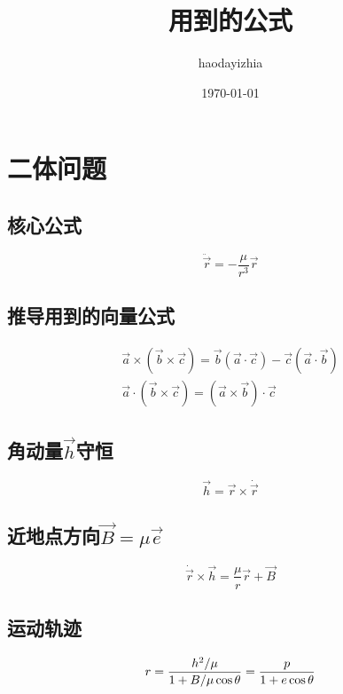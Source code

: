 \documentclass[UTF8]{ctexart}
\title{用到的公式}
\author{haodayizhia}
\date{\today}
\begin{document}
\renewcommand\theequation{%
\thesection.\arabic{equation}}

\maketitle
\tableofcontents
\section{二体问题}

\subsection{核心公式}
\begin{equation}
	\ddot{\vec{r}}=-\frac{\mu}{r^3}\vec{r}
\end{equation}

\subsection{推导用到的向量公式}

\begin{gather}
\vec{a}\times(\vec{b}\times\vec c) =\vec{b}(\vec{a}\cdot\vec{c})-\vec{c}(\vec{a}\cdot\vec{b})\\
\vec{a}\cdot(\vec{b}\times\vec{c})=(\vec{a}\times\vec{b})\cdot\vec{c}
\end{gather}

\subsection{角动量$\vec{h}$守恒}
\begin{equation}
	\vec{h}=\vec{r}\times\dot{\vec{r}}
\end{equation}

\subsection{近地点方向$\vec{B}=\mu\vec{e}$}
\begin{equation}
	\dot{\vec{r}}\times\vec{h}=\frac{\mu}{r}\vec{r}+\vec{B}
\end{equation}

\subsection{运动轨迹}
\begin{equation}
	r=\frac{h^2/\mu}{1+B/\mu\cos \theta}=\frac{p}{1+e\cos\theta}\\
\end{equation}
\end{document}
